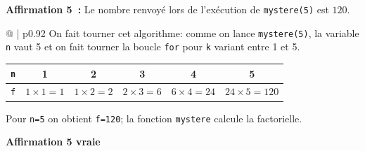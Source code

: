 \begin{enumerate}
\begin{center}
\end{center}

\textbf{Affirmation 5~:} Le nombre renvoyé lors de l'exécution de \texttt{mystere(5)} est $120$.


\medskip

\begin{tabular}{@{\hspace{0.05\linewidth}} | p{0.92\linewidth}}
On fait tourner cet algorithme: comme on lance \texttt{mystere(5)}, la variable \texttt{n} vaut 5 et on fait tourner la boucle \texttt{for} pour \texttt{k} variant entre 1 et 5.

\begin{center}
\begin{tabular}{| *6{c |} }
\hline
\texttt{n} & 1&2&3&4&5\\
\hline
\texttt{f} & $1\times 1=1$ & $1\times 2=2$ & $2\times 3=6$ & $6 \times 4=24$ & $24\times 5=120$\\
\hline
\end{tabular}
\end{center}

Pour \texttt{n=5} on obtient \texttt{f=120}; la fonction \texttt{mystere} calcule la factorielle.

\hfill \textbf{Affirmation 5 vraie} 
\end{tabular}

\end{enumerate}
